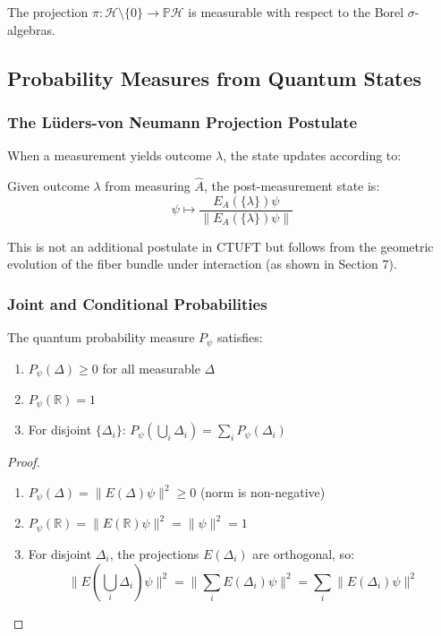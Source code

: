 \begin{theorem}
The projection $\pi: \mathcal{H} \setminus \{0\} \to \mathbb{P}\mathcal{H}$ is measurable with respect to the Borel $\sigma$-algebras.
\end{theorem}

\subsection{Probability Measures from Quantum States}

\subsubsection{The Lüders-von Neumann Projection Postulate}

When a measurement yields outcome $\lambda$, the state updates according to:

\begin{definition}
Given outcome $\lambda$ from measuring $\hat{A}$, the post-measurement state is:
\begin{equation}
    \psi \mapsto \frac{E_A(\{\lambda\})\psi}{\|E_A(\{\lambda\})\psi\|}
\end{equation}
\end{definition}

This is not an additional postulate in CTUFT but follows from the geometric evolution of the fiber bundle under interaction (as shown in Section 7).

\subsubsection{Joint and Conditional Probabilities}

\begin{theorem}
The quantum probability measure $P_\psi$ satisfies:
\begin{enumerate}
    \item $P_\psi(\Delta) \geq 0$ for all measurable $\Delta$
    \item $P_\psi(\mathbb{R}) = 1$
    \item For disjoint $\{\Delta_i\}$: $P_\psi(\bigcup_i \Delta_i) = \sum_i P_\psi(\Delta_i)$
\end{enumerate}
\end{theorem}

\begin{proof}
\begin{enumerate}
    \item $P_\psi(\Delta) = \|E(\Delta)\psi\|^2 \geq 0$ (norm is non-negative)
    \item $P_\psi(\mathbb{R}) = \|E(\mathbb{R})\psi\|^2 = \|\psi\|^2 = 1$
    \item For disjoint $\Delta_i$, the projections $E(\Delta_i)$ are orthogonal, so:
    \begin{equation}
        \|E(\bigcup_i \Delta_i)\psi\|^2 = \|\sum_i E(\Delta_i)\psi\|^2 = \sum_i \|E(\Delta_i)\psi\|^2
    \end{equation}
\end{enumerate}
\end{proof}

